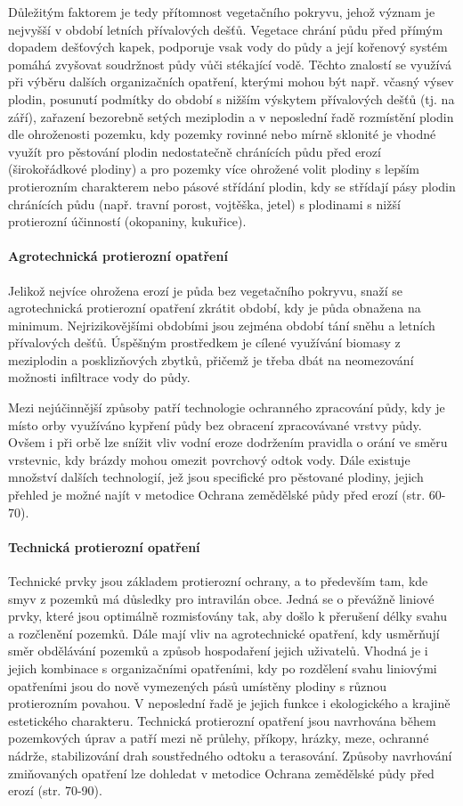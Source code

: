 Důležitým faktorem je tedy přítomnost vegetačního pokryvu, jehož význam je nejvyšší v období letních přívalových dešťů. Vegetace chrání půdu před přímým dopadem dešťových kapek, podporuje vsak vody do půdy a její kořenový systém pomáhá zvyšovat soudržnost půdy vůči stékající vodě. Těchto znalostí se využívá při výběru dalších organizačních opatření, kterými mohou být např. včasný výsev plodin, posunutí podmítky do období s nižším výskytem přívalových dešťů (tj. na září), zařazení bezorebně setých meziplodin a v neposlední řadě rozmístění plodin dle ohroženosti pozemku, kdy pozemky rovinné nebo mírně sklonité je vhodné využít pro pěstování plodin nedostatečně chránících půdu před erozí (širokořádkové plodiny) a pro pozemky více ohrožené volit plodiny s lepším protierozním charakterem nebo pásové střídání plodin, kdy se střídají pásy plodin chránících půdu (např. travní porost, vojtěška, jetel) s plodinami s nižší protierozní účinností (okopaniny, kukuřice).

\paragraph{Agrotechnická protierozní opatření}
Jelikož nejvíce ohrožena erozí je půda bez vegetačního pokryvu, snaží se agrotechnická protierozní opatření zkrátit období, kdy je půda obnažena na minimum. Nejrizikovějšími obdobími jsou zejména období tání sněhu a letních přívalových dešťů. Úspěšným prostředkem je cílené využívání biomasy z meziplodin a posklizňových zbytků, přičemž je třeba dbát na neomezování možnosti infiltrace vody do půdy. 

Mezi nejúčinnější způsoby patří technologie ochranného zpracování půdy, kdy je místo orby využíváno kypření půdy bez obracení zpracovávané vrstvy půdy. Ovšem i při orbě lze snížit vliv vodní eroze dodržením pravidla o orání ve směru vrstevnic, kdy brázdy mohou omezit povrchový odtok vody. Dále existuje množství dalších technologií, jež jsou specifické pro pěstované plodiny, jejich přehled je možné najít v metodice Ochrana zemědělské půdy před erozí (str. 60-70).

\paragraph{Technická protierozní opatření}
Technické prvky jsou základem protierozní ochrany, a to především tam, kde smyv z pozemků má důsledky pro intravilán obce. Jedná se o převážně liniové prvky, které jsou optimálně rozmisťovány tak, aby došlo k přerušení délky svahu a rozčlenění pozemků. Dále mají vliv na agrotechnické opatření, kdy usměrňují směr obdělávání pozemků a způsob hospodaření jejich uživatelů. Vhodná je i jejich kombinace s organizačními opatřeními, kdy po rozdělení svahu liniovými opatřeními jsou do nově vymezených pásů umístěny plodiny s různou protierozním povahou. V neposlední řadě je jejich funkce i ekologického a krajině estetického charakteru. Technická protierozní opatření jsou navrhována během pozemkových úprav a patří mezi ně průlehy, příkopy, hrázky, meze, ochranné nádrže, stabilizování drah soustředného odtoku a terasování. Způsoby navrhování zmiňovaných opatření lze dohledat v metodice Ochrana zemědělské půdy před erozí (str. 70-90).

